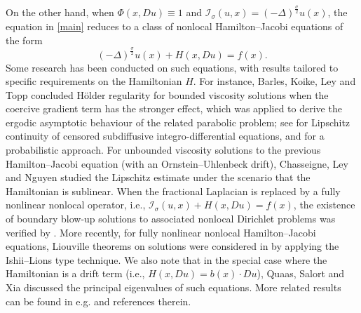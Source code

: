 \documentclass[11pt,reqno]{amsart}
\numberwithin{equation}{section}
\begin{document}
On the other hand,  when $\Phi(x, Du)\equiv1$ and $\mathcal{I}_\sigma (u,x)=(-\Delta)^{\frac{\sigma}{2}}u(x)$,  the equation in \eqref{main} reduces to a class of nonlocal Hamilton--Jacobi equations of the form
$$
(-\Delta)^{\frac{\sigma}{2}}u(x)+H(x,Du)=f(x).
$$
Some research has been conducted on such equations, with results tailored to specific requirements on the Hamiltonian $H$. For instance, Barles, Koike, Ley and Topp \cite{BKLT15} concluded H\"{o}lder regularity for bounded viscosity solutions when the coercive gradient term has the stronger effect, which was applied to derive the ergodic asymptotic behaviour of the related parabolic problem; see \cite{BT16} for Lipschitz continuity of censored subdiffusive integro-differential equations, and \cite{CR11} for a probabilistic approach. For unbounded viscosity solutions to the previous Hamilton--Jacobi equation (with an Ornstein--Uhlenbeck drift), Chasseigne, Ley and Nguyen \cite{CLN19} studied the Lipschitz estimate under the scenario that the Hamiltonian is sublinear. When the fractional Laplacian is replaced by a fully nonlinear nonlocal operator, i.e., $\mathcal{I}_\sigma (u, x)+H(x, Du)=f(x)$, the existence of boundary blow-up solutions to associated nonlocal Dirichlet problems was verified by \cite{DQT24}. More recently, for fully nonlinear nonlocal Hamilton--Jacobi equations, Liouville theorems on solutions were considered in \cite{BQT25} by applying the Ishii--Lions type technique. We also note that in the special case where the Hamiltonian is a drift term (i.e., $H(x, Du)=b(x)\cdot Du$), Quaas, Salort and Xia \cite{QSX20} discussed the principal eigenvalues of such equations. More related results can be found in e.g. \cite{BK23, BT25a, DJZ18, CD12} and references therein.
\end{document}
